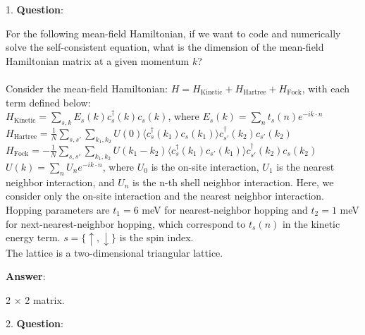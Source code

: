 \documentclass{article}
\begin{document}
1. \textbf{Question}:

   For the following mean-field Hamiltonian, if we want to code and numerically solve the self-consistent equation, what is the dimension of the mean-field Hamiltonian matrix at a given momentum $k$? \\ \\Consider the mean-field Hamiltonian: $H = H_{\text{Kinetic}} + H_{\text{Hartree}} +H_{\text{Fock}}$, with each term defined below: \\$H_{\text{Kinetic}} = \sum_{s, k} E_s(k) c^\dagger_s(k) c_s(k)$, where $E_s(k)=\sum_{n} t_s(n) e^{-i k \cdot n}$  \\$H_{\text{Hartree}} = \frac{1}{N} \sum_{s, s'} \sum_{k_1, k_2} U(0) \langle c_s^\dagger(k_1) c_s(k_1) \rangle c_{s'}^\dagger(k_2) c_{s'}(k_2)$ \\$H_{\text{Fock}} = -\frac{1}{N} \sum_{s, s'} \sum_{k_1, k_2} U(k_1 - k_2) \langle c_s^\dagger(k_1) c_{s'}(k_1) \rangle c_{s'}^\dagger(k_2) c_s(k_2)$ \\$U(k) = \sum_{n} U_n e^{-i k \cdot n}$, where $U_0$ is the on-site interaction, $U_1$ is the nearest neighbor interaction, and $U_n$ is the n-th shell neighbor interaction. Here, we consider only the on-site interaction and the nearest neighbor interaction. \\Hopping parameters are $t_1 = 6$ meV for nearest-neighbor hopping and $t_2 = 1$ meV for next-nearest-neighbor hopping, which correspond to $t_s(n)$ in the kinetic energy term. $s = \{\uparrow, \downarrow\}$ is the spin index. \\The lattice is a two-dimensional triangular lattice.

   \textbf{Answer}:

   2 $\times$ 2 matrix. \\


\clearpage

2. \textbf{Question}:
\end{document}
